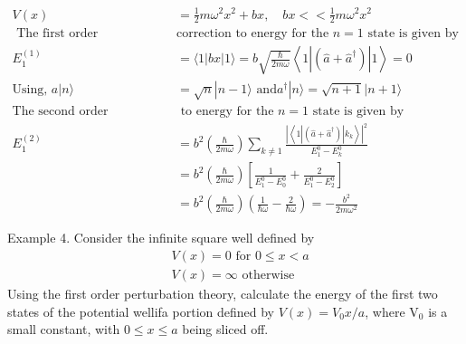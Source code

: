 \begin{answer}
	\begin{align*}
	V(x)&=\frac{1}{2} m \omega^{2} x^{2}+b x, \quad b x<<\frac{1}{2} m \omega^{2} x^{2}\\
\text{	The first order }&\text{correction to energy for the $n=1$ state is given by}\\
	E_{1}^{(1)}&=\langle 1|b x| 1\rangle=b \sqrt{\frac{\hbar}{2 m \omega}}\left\langle 1\left|\left(\hat{a}+\hat{a}^{\dagger}\right)\right| 1\right\rangle=0\\
	\text{Using, }a|n\rangle&=\sqrt{n}|n-1\rangle\text{ and} a^{\dagger}|n\rangle=\sqrt{n+1}|n+1\rangle\\
	\text{The second order correction}&\text{ to energy for the $n=1$ state is given by}\\
	E_{1}^{(2)} &=b^{2}\left(\frac{\hbar}{2 m \omega}\right) \sum_{k \neq 1} \frac{\left|\left\langle 1\left|\left(\hat{a}+\hat{a}^{\dagger}\right)\right| k_{k}\right\rangle\right|^{2}}{E_{1}^{0}-E_{k}^{0}}\\&=b^{2}\left(\frac{\hbar}{2 m \omega}\right)\left[\frac{1}{E_{1}^{0}-E_{0}^{0}}+\frac{2}{E_{1}^{0}-E_{2}^{0}}\right] \\
	&=b^{2}\left(\frac{\hbar}{2 m \omega}\right)\left(\frac{1}{\hbar \omega}-\frac{2}{\hbar \omega}\right)=-\frac{b^{2}}{2 m \omega^{2}}
	\end{align*}
\end{answer}
\begin{exercise}
	Example 4. Consider the infinite square well defined by
	$$
	\begin{aligned}
	&V(x)=0 \text { for } 0 \leq x<a \\
	&V(x)=\infty \text { otherwise }
	\end{aligned}
	$$
	Using the first order perturbation theory, calculate the energy of the first two states of the potential wellifa portion defined by $V(x)=V_{0} x / a$, where $\mathrm{V}_{0}$ is a small constant, with $0 \leq x \leq a$ being sliced off.
\end{exercise}
